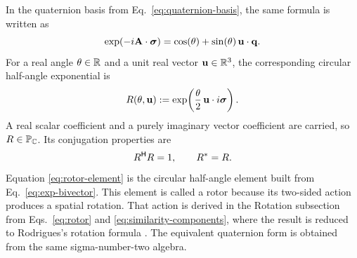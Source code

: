 In the quaternion basis from Eq.\ \eqref{eq:quaternion-basis}, the same
formula is written as
\begin{equation*}
\exp(-i\mathbf{A}\cdot\mathbf{\bm{\sigma}})
=\cos(\theta)+\sin(\theta)\,\mathbf{u}\cdot\mathbf{q}.
\end{equation*}
For a real angle \(\theta\in\mathbb{R}\) and a unit real vector \(\mathbf{u}\in\mathbb{R}^3\), the corresponding circular half-angle exponential is
\begin{equation}
R(\theta,\mathbf{u}):=\exp\!\left(\frac{\theta}{2}\,\mathbf{u}\cdot i\mathbf{\bm{\sigma}}\right).
\label{eq:rotor-element}
\end{equation}
A real scalar coefficient and a purely imaginary vector coefficient are
carried, so \(R\in\mathbb{P}_{\mathbb{C}}\).
Its conjugation properties are
\[
R^{\mathsf H}R=1,
\qquad
R^{*}=R.
\]
Equation \eqref{eq:rotor-element} is the circular half-angle element built
from Eq.\ \eqref{eq:exp-bivector}. This element is called a rotor because
its two-sided action produces a spatial rotation. That action is derived in
the Rotation subsection from Eqs.\ \eqref{eq:rotor} and
\eqref{eq:similarity-components}, where the result is reduced to
Rodrigues's rotation formula \cite{doran2003}. The
equivalent quaternion form is obtained from the same sigma-number-two
algebra.

